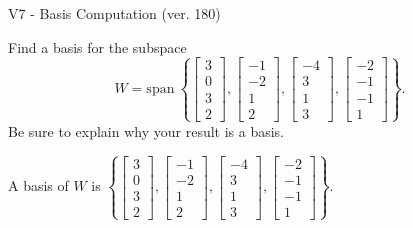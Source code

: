 \begin{exercise}
  \begin{exerciseTitle}V7 - Basis Computation (ver. 180)\end{exerciseTitle}
  \begin{exerciseStatement}
    Find a basis for the subspace 
\[W=\mathrm{span}\ \left\{\left[\begin{array}{r}
3 \\
0 \\
3 \\
2
\end{array}\right] , \left[\begin{array}{r}
-1 \\
-2 \\
1 \\
2
\end{array}\right] , \left[\begin{array}{r}
-4 \\
3 \\
1 \\
3
\end{array}\right] , \left[\begin{array}{r}
-2 \\
-1 \\
-1 \\
1
\end{array}\right]\right\}.\]
 Be sure to explain why your result is a basis.


  \end{exerciseStatement}
  \begin{exerciseAnswer}
   A basis of \(W\) is  \(\left\{\left[\begin{array}{r}
3 \\
0 \\
3 \\
2
\end{array}\right] , \left[\begin{array}{r}
-1 \\
-2 \\
1 \\
2
\end{array}\right] , \left[\begin{array}{r}
-4 \\
3 \\
1 \\
3
\end{array}\right] , \left[\begin{array}{r}
-2 \\
-1 \\
-1 \\
1
\end{array}\right]\right\}\).
  


  \end{exerciseAnswer}
\end{exercise}